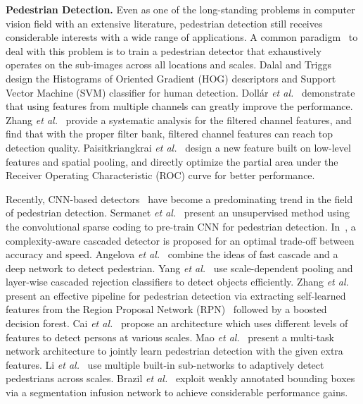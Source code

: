 \documentclass[journal]{IEEEtran}
\def\etal{{\em et al.}}
\begin{document}
{\flushleft \textbf{Pedestrian Detection.}}
Even as one of the long-standing problems in computer vision field with an extensive literature, pedestrian detection still receives considerable interests with a wide range of applications. A common paradigm~\cite{DBLP:conf/bmvc/DollarTPB09,DBLP:conf/cvpr/YanZLLL13,DBLP:conf/cvpr/ZhangBC14} to deal with this problem is to train a pedestrian detector that exhaustively operates on the sub-images across all locations and scales. Dalal and Triggs~\cite{DBLP:conf/cvpr/DalalT05} design the Histograms of Oriented Gradient (HOG) descriptors and Support Vector Machine (SVM) classifier for human detection. Doll{\'{a}}r \etal~\cite{DBLP:journals/pami/DollarABP14} demonstrate that using features from multiple channels can greatly improve the performance. Zhang \etal~\cite{DBLP:conf/cvpr/ZhangBS15} provide a systematic analysis for the filtered channel features, and find that with the proper filter bank, filtered channel features can reach top detection quality. Paisitkriangkrai \etal~\cite{DBLP:conf/eccv/PaisitkriangkraiSH14} design a new feature built on low-level features and spatial pooling, and directly optimize the partial area under the Receiver Operating Characteristic (ROC) curve for better performance.

Recently, CNN-based detectors~\cite{DBLP:conf/cvpr/SermanetKCL13,DBLP:conf/cvpr/HosangOBS15,DBLP:conf/cvpr/TianLWT15,DBLP:conf/iccv/BrazilYL17} have become a predominating trend in the field of pedestrian detection. Sermanet \etal~\cite{DBLP:conf/cvpr/SermanetKCL13} present an unsupervised method using the convolutional sparse coding to pre-train CNN for pedestrian detection. In~\cite{DBLP:conf/iccv/CaiSV15}, a complexity-aware cascaded detector is proposed for an optimal trade-off between accuracy and speed. Angelova \etal~\cite{DBLP:conf/bmvc/AngelovaKVOF15} combine the ideas of fast cascade and a deep network to detect pedestrian. Yang \etal~\cite{DBLP:conf/cvpr/YangCL16} use scale-dependent pooling and layer-wise cascaded rejection classifiers to detect objects efficiently. Zhang \etal~\cite{DBLP:conf/eccv/ZhangLLH16} present an effective pipeline for pedestrian detection via extracting self-learned features from the Region Proposal Network (RPN)~\cite{DBLP:journals/pami/RenHG017} followed by a boosted decision forest. Cai \etal~\cite{DBLP:conf/eccv/CaiFFV16} propose an architecture which uses different levels of features to detect persons at various scales. Mao \etal~\cite{DBLP:conf/cvpr/MaoXJC17} present a multi-task network architecture to jointly learn pedestrian detection with the given extra features. Li \etal~\cite{DBLP:journals/tmm/LiLSXFY18} use multiple built-in sub-networks to adaptively detect pedestrians across scales. Brazil \etal~\cite{DBLP:conf/iccv/BrazilYL17} exploit weakly annotated bounding boxes via a segmentation infusion network to achieve considerable performance gains.
\end{document}
